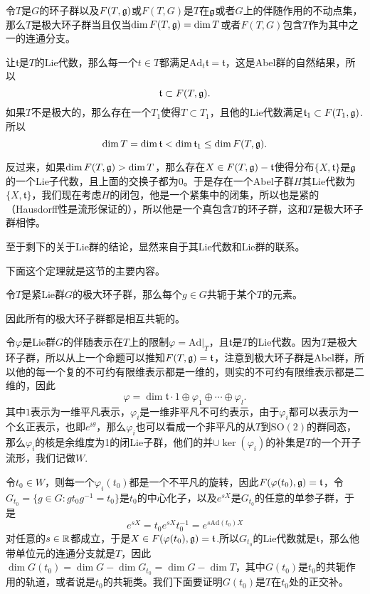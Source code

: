 \pro 令$T$是$G$的环子群以及$F(T,{\mathfrak{g}})$或$F(T,G)$是$T$在${\mathfrak{g}}$或者$G$上的伴随作用的不动点集，那么$T$是极大环子群当且仅当$\dim F(T,{\mathfrak{g}})=\dim T$或者$F(T,G)$包含$T$作为其中之一的连通分支。

让$\mathfrak{t}$是$T$的Lie代数，那么每一个$t\in T$都满足$\mathrm{Ad}_t\mathfrak{t}=\mathfrak{t}$，这是Abel群的自然结果，所以
\[
	\mathfrak{t}\subset F(T,{\mathfrak{g}}).
\]
如果$T$不是极大的，那么存在一个$T_1$使得$T\subset T_1$，且他的Lie代数满足$\mathfrak{t}_1\subset F(T_1,{\mathfrak{g}})$.所以
\[
	\dim T=\dim \mathfrak{t}<\dim \mathfrak{t}_1\leq \dim F(T,{\mathfrak{g}}).
\]

反过来，如果$\dim  F(T,{\mathfrak{g}})>\dim T$，那么存在$X\in F(T,{\mathfrak{g}})-\mathfrak{t}$使得分布$\{X,\mathfrak{t}\}$是${\mathfrak{g}}$的一个Lie子代数，且上面的交换子都为$0$。于是存在一个Abel子群$H$其Lie代数为$\{X,\mathfrak{t}\}$，我们现在考虑$H$的闭包，他是一个紧集中的闭集，所以也是紧的（Hausdorff性是流形保证的），所以他是一个真包含$T$的环子群，这和$T$是极大环子群相悖。

至于剩下的关于Lie群的结论，显然来自于其Lie代数和Lie群的联系。

下面这个定理就是这节的主要内容。

\theo 令$T$是紧Lie群$G$的极大环子群，那么每个$g\in G$共轭于某个$T$的元素。

因此所有的极大环子群都是相互共轭的。

令$\varphi$是Lie群$G$的伴随表示在$T$上的限制$\varphi=\mathrm{Ad}|_T$，且$\mathfrak{t}$是$T$的Lie代数。因为$T$是极大环子群，所以从上一个命题可以推知$F(T,{\mathfrak{g}})=\mathfrak{t}$，注意到极大环子群是Abel群，所以他的每一个复的不可约有限维表示都是一维的，则实的不可约有限维表示都是二维的，因此
\[
\varphi=\dim \mathfrak{t}\cdot 1\oplus \varphi_1\oplus\cdots \oplus \varphi_l.
\]
其中$1$表示为一维平凡表示，$\varphi_i$是一维非平凡不可约表示，由于$\varphi_i$都可以表示为一个幺正表示，也即$e^{i\theta}$，那么$\varphi_i$也可以看成一个非平凡的从$T$到$\mathrm{SO}(2)$的群同态，那么$\varphi_i$的核是余维度为1的闭Lie子群，他们的并$\cup\ker(\varphi_i)$的补集是$T$的一个开子流形，我们记做$W$.

令$t_0\in W$，则每一个$\varphi_i(t_0)$都是一个不平凡的旋转，因此$F(\varphi(t_0),{\mathfrak{g}})=\mathfrak{t}$，令$G_{t_0}=\{g\in G:gt_0g^{-1}=t_0\}$是$t_0$的中心化子，以及$e^{sX}$是$G_{t_0}$的任意的单参子群，于是
\[
	e^{sX}=t_0e^{sX}t_0^{-1}=e^{s\mathrm{Ad}(t_0)X}
\]
对任意的$s\in\mathbb{R}$都成立，于是$X\in F(\varphi(t_0),{\mathfrak{g}})=\mathfrak{t}$.所以$G_{t_0}$的Lie代数就是$\mathfrak{t}$，那么他带单位元的连通分支就是$T$，因此$\dim G(t_0)=\dim G -\dim G_{t_0}=\dim G -\dim T$，其中$G(t_0)$是$t_0$的共轭作用的轨道，或者说是$t_0$的共轭类。我们下面要证明$G(t_0)$是$T$在$t_0$处的正交补。

